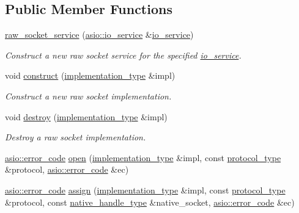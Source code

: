 \subsection*{Public Member Functions}
\begin{DoxyCompactItemize}
\item 
\hyperlink{classasio_1_1raw__socket__service_ab1472767bef27b633f73b5244ea715d2}{raw\+\_\+socket\+\_\+service} (\hyperlink{classasio_1_1io__service}{asio\+::io\+\_\+service} \&\hyperlink{classasio_1_1io__service}{io\+\_\+service})
\begin{DoxyCompactList}\small\item\em Construct a new raw socket service for the specified \hyperlink{classasio_1_1io__service}{io\+\_\+service}. \end{DoxyCompactList}\item 
void \hyperlink{classasio_1_1raw__socket__service_a5d7099fa55e414c87a1657da7736e8ce}{construct} (\hyperlink{classasio_1_1raw__socket__service_aa2e0ef73d6504fbcab510cb835e9e3d9}{implementation\+\_\+type} \&impl)
\begin{DoxyCompactList}\small\item\em Construct a new raw socket implementation. \end{DoxyCompactList}\item 
void \hyperlink{classasio_1_1raw__socket__service_a7fbd39eb2454396c71835f64dfbfa246}{destroy} (\hyperlink{classasio_1_1raw__socket__service_aa2e0ef73d6504fbcab510cb835e9e3d9}{implementation\+\_\+type} \&impl)
\begin{DoxyCompactList}\small\item\em Destroy a raw socket implementation. \end{DoxyCompactList}\item 
\hyperlink{classasio_1_1error__code}{asio\+::error\+\_\+code} \hyperlink{classasio_1_1raw__socket__service_a35095439db38736aaa8d0590e8297b42}{open} (\hyperlink{classasio_1_1raw__socket__service_aa2e0ef73d6504fbcab510cb835e9e3d9}{implementation\+\_\+type} \&impl, const \hyperlink{classasio_1_1raw__socket__service_a7d559e265719280febe97fe07fbb524d}{protocol\+\_\+type} \&protocol, \hyperlink{classasio_1_1error__code}{asio\+::error\+\_\+code} \&ec)
\item 
\hyperlink{classasio_1_1error__code}{asio\+::error\+\_\+code} \hyperlink{classasio_1_1raw__socket__service_ad5d62e2730ff170e77c70ac14c837da6}{assign} (\hyperlink{classasio_1_1raw__socket__service_aa2e0ef73d6504fbcab510cb835e9e3d9}{implementation\+\_\+type} \&impl, const \hyperlink{classasio_1_1raw__socket__service_a7d559e265719280febe97fe07fbb524d}{protocol\+\_\+type} \&protocol, const \hyperlink{classasio_1_1raw__socket__service_a79802711654c4d649ff11b7fe238b927}{native\+\_\+handle\+\_\+type} \&native\+\_\+socket, \hyperlink{classasio_1_1error__code}{asio\+::error\+\_\+code} \&ec)

\end{DoxyCompactItemize}
